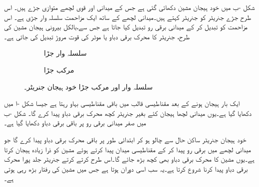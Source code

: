 شکل -ب میں خود ہیجان مشین دکھائی گئی ہے جس کے میدانی اور قوی لچھے متوازی جڑے ہیں۔ اس طرح جڑے جنریٹر کو  جنریٹر کہتے ہیں۔میدانی لچھے کے ساتھ ایک مزاحمت سلسلہ وار جڑی ہے۔ اس مزاحمت  کو تبدیل کر کے میدانی برقی رو تبدیل کیا جاتا ہے جس سے،بالکل بیرونی ہیجان مشین کی طرح، جنریٹر کا محرک برقی دباو یا موٹر کی قوت مروڑ تبدیل کی جاتی ہے۔
\begin{figure}
\centering
\begin{subfigure}{0.45\textwidth}
\centering
{}
\caption{سلسلہ وار جڑا}
\end{subfigure}%
\begin{subfigure}{0.45\textwidth}
\centering
{}
\caption{مرکب جڑا}
\end{subfigure}
\caption{سلسلہ وار اور مرکب جڑا خود ہیجان جنریٹر۔}
\label{شکل_یکسمتی_سلسلہ_وار_اور_مرکب}
\end{figure}
 ایک بار ہیجان ہونے کے بعد مقناطیسی قالب میں  باقی مقناطیسی بہاو رہتا ہے جیسا شکل -ا میں دکھایا گیا ہے۔یوں میدانی لچھا ہیجان کئے بغیر جنریٹر کچھ  محرک برقی دباو پیدا کرے گا۔   شکل -ب میں   صفر میدانی برقی رو پر باقی برقی دباو   دکھایا گیا ہے۔

 خود ہیجان جنریٹر ساکن حال سے چالو ہو کر  ابتدائی طور پر باقی محرک برقی دباو پیدا کرے گا جو میدانی لچھے میں برقی رو پیدا کر کے  مقناطیسی میدان پیدا کرتے ہوئے  مشین کو ذرا زیادہ ہیجان کرتا ہے۔یوں مشین کا محرک برقی دباو بھی کچھ بڑھ جائے گا۔اس طرح کرتے کرتے جنریٹر جلد پورا محرک برقی دباو پیدا کرنا شروع کرتا ہے۔یہ سب اسی دوران  ہوتا ہے جس میں مشین کی رفتار بڑھ رہی ہوتی ہے۔

